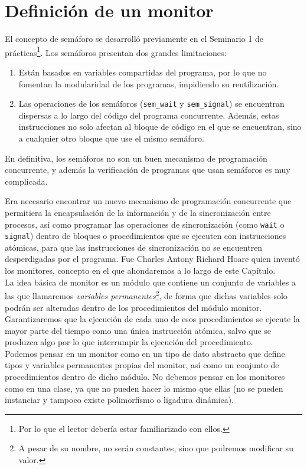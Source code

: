 \section{Definición de un monitor}
El concepto de semáforo se desarrolló previamente en el Seminario 1 de prácticas\footnote{Por lo que el lector debería estar familiarizado con ellos.}. Los semáforos presentan dos grandes limitaciones:
\begin{enumerate}
    \item Están basados en variables compartidas del programa, por lo que no fomentan la modularidad de los programas, impidiendo su reutilización.
    \item Las operaciones de los semáforos (\verb|sem_wait| y \verb|sem_signal|) se encuentran dispersas a lo largo del código del programa concurrente. Además, estas instrucciones no solo afectan al bloque de código en el que se encuentran, sino a cualquier otro bloque que use el mismo semáforo.
\end{enumerate}
En definitiva, los semáforos no son un buen mecanismo de programación concurrente, y además la verificación de programas que usan semáforos es muy complicada. 

Era necesario encontrar un nuevo mecanismo de programación concurrente que permitiera la encapsulación de la información y de la sincronización entre procesos, así como programar las operaciones de sincronización (como \verb|wait| o \verb|signal|) dentro de bloques o procedimientos que se ejecuten con instrucciones atómicas, para que las instrucciones de sincronización no se encuentren desperdigadas por el programa.
Fue Charles Antony Richard Hoare quien inventó los monitores, concepto en el que ahondaremos a lo largo de este Capítulo.\\

La idea básica de monitor es un módulo que contiene un conjunto de variables a las que llamaremos \textit{variables permanentes}\footnote{A pesar de su nombre, no serán constantes, sino que podremos modificar su valor.}, de forma que dichas variables solo podrán ser alteradas dentro de los procedimientos del módulo monitor. Garantizaremos que la ejecución de cada uno de esos procedimientos se ejecute la mayor parte del tiempo como una única instrucción atómica, salvo que se produzca algo por lo que interrumpir la ejecución del procedimiento.\\

Podemos pensar en un monitor como en un tipo de dato abstracto que define tipos y variables permanentes propias del monitor, así como un conjunto de procedimientos dentro de dicho módulo. No debemos pensar en los monitores como en una clase, ya que no pueden hacer lo mismo que ellas (no se pueden instanciar y tampoco existe polimorfismo o ligadura dinámica).

